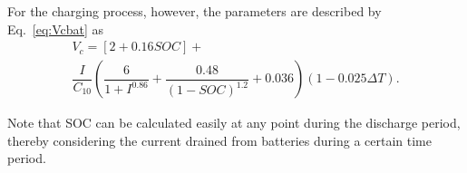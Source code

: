 \documentclass[journal]{IEEEtran}
\begin{document}
For the charging process, however, the parameters are described by Eq.~\eqref{eq:Vcbat} as
%
\begin{multline}
\label{eq:Vcbat}
V_{c} = [2+0.16SOC]+ \\ \dfrac{I}{C_{10}} \left( \dfrac{6}{1+I^{0.86}} + \dfrac{0.48}{(1-SOC)^{1.2}} + 0.036  \right) (1-0.025 \Delta T).
\end{multline}

Note that SOC can be calculated easily at any point during the discharge period, thereby considering the current drained from batteries during a certain time period. %
%
%
%
%
%
%
\end{document}
